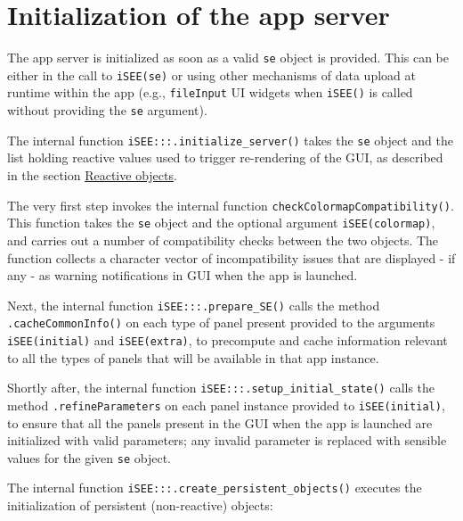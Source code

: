 \documentclass[]{book}
\begin{document}
\section{Initialization of the app
server}\label{initialization-of-the-app-server}

The app server is initialized as soon as a valid \texttt{se} object is
provided. This can be either in the call to \texttt{iSEE(se)} or using
other mechanisms of data upload at runtime within the app (e.g.,
\texttt{fileInput} UI widgets when \texttt{iSEE()} is called without
providing the \texttt{se} argument).

The internal function \texttt{iSEE:::.initialize\_server()} takes the
\texttt{se} object and the list holding reactive values used to trigger
re-rendering of the GUI, as described in the section
\protect\hyperlink{robjects}{Reactive objects}.

The very first step invokes the internal function
\texttt{checkColormapCompatibility()}. This function takes the
\texttt{se} object and the optional argument \texttt{iSEE(colormap)},
and carries out a number of compatibility checks between the two
objects. The function collects a character vector of incompatibility
issues that are displayed - if any - as warning notifications in GUI
when the app is launched.

Next, the internal function \texttt{iSEE:::.prepare\_SE()} calls the
method \texttt{.cacheCommonInfo()} on each type of panel present
provided to the arguments \texttt{iSEE(initial)} and
\texttt{iSEE(extra)}, to precompute and cache information relevant to
all the types of panels that will be available in that app instance.

Shortly after, the internal function
\texttt{iSEE:::.setup\_initial\_state()} calls the method
\texttt{.refineParameters} on each panel instance provided to
\texttt{iSEE(initial)}, to ensure that all the panels present in the GUI
when the app is launched are initialized with valid parameters; any
invalid parameter is replaced with sensible values for the given
\texttt{se} object.

The internal function \texttt{iSEE:::.create\_persistent\_objects()}
executes the initialization of persistent (non-reactive) objects:
\end{document}
